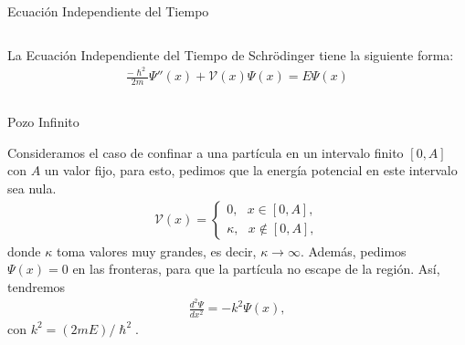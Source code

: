 \documentclass[aspectratio=1610]{beamer}
\begin{document}
\begin{frame}
\begin{columns}
\column{37em}
\vspace{1cm}
\Huge{\centerline{Ecuación Independiente del Tiempo}}
\end{columns}
\end{frame}


\begin{frame}{}
La Ecuación Independiente del Tiempo de Schrödinger tiene la siguiente forma:   
    \begin{align}
        \frac{-\hslash^2}{2m}\Psi''(x) + \mathcal{V}(x)\Psi(x) = E \Psi(x)
        \label{eq:EITS}
    \end{align}

\begin{columns}
\column{37em}
\end{columns}
\end{frame}

\begin{frame}{Pozo Infinito}
   
Consideramos el caso de confinar a una partícula en un intervalo finito $[0 , A]$ con $A$ un valor fijo, para esto, pedimos que la energía potencial en este intervalo sea nula.
\begin{align*}
        \mathcal{V}(x) = 
        \left\{ \begin{array}{ll}
        0, \:\:\:  x \in [0,A],
        \\
        \kappa, \:\:\: x \notin [0,A],
        \end{array}
        \right.
\end{align*}
donde $\kappa$ toma valores muy grandes, es decir, $\kappa \to\infty$. Además, pedimos $\Psi(x) = 0$ en las fronteras, para que la partícula no escape de la región. Así, tendremos 
\begin{align*}
    \frac{d^2\Psi}{dx^2} = -k^2\Psi(x),
\end{align*}
con $k^2 = (2mE)/\hslash^2$.
    
\begin{columns}
\column{37em}
\end{columns}
\end{frame}
\end{document}
